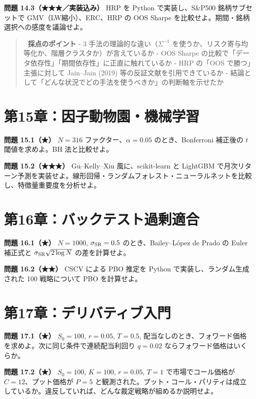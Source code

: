 \documentclass[11pt,a4paper]{report}
\begin{document}
\textbf{問題 14.3（★★★／実装込み）} HRP を Python で実装し、S\&P500 銘柄サブセットで GMV（LW縮小）、ERC、HRP の OOS Sharpe を比較せよ。期間・銘柄選択への感度を議論せよ。

\begin{quote}
📝 \textbf{採点のポイント}
- 3 手法の理論的な違い（$\Sigma^{-1}$ を使うか、リスク寄与均等化か、階層クラスタか）が言えているか
- OOS Sharpe の比較で「データ依存性」「期間依存性」に正直に触れているか
- HRP の「OOS で勝つ」主張に対して Jain–Jain (2019) 等の反証文献を引用できているか
- 結論として「どんな状況でどの手法を使うべきか」の判断軸を示せたか
\end{quote}

\section{第15章：因子動物園・機械学習}

\textbf{問題 15.1（★）} $N = 316$ ファクター、$\alpha = 0.05$ のとき、Bonferroni 補正後の $t$ 閾値を求めよ。BH 法と比較せよ。

\textbf{問題 15.2（★★★）} Gu–Kelly–Xiu 風に、scikit-learn と LightGBM で月次リターン予測を実装せよ。線形回帰・ランダムフォレスト・ニューラルネットを比較し、特徴量重要度を分析せよ。

\section{第16章：バックテスト過剰適合}

\textbf{問題 16.1（★）} $N = 1000$, $\sigma_{\rm SR} = 0.5$ のとき、Bailey–López de Prado の Euler 補正式と $\sigma_{\rm SR}\sqrt{2 \log N}$ の差を計算せよ。

\textbf{問題 16.2（★★）} CSCV による PBO 推定を Python で実装し、ランダム生成された 100 戦略について PBO を計算せよ。

\section{第17章：デリバティブ入門}

\textbf{問題 17.1（★）} $S_0 = 100$, $r = 0.05$, $T = 0.5$, 配当なしのとき、フォワード価格を求めよ。次に同じ条件で連続配当利回り $q = 0.02$ ならフォワード価格はいくらか。

\textbf{問題 17.2（★）} $S_0 = 100$, $K = 100$, $r = 0.05$, $T = 1$ で市場でコール価格が $C = 12$、プット価格が $P = 5$ と観測された。プット・コール・パリティは成立しているか。違反していれば、どんな裁定戦略が組めるか説明せよ。
\end{document}
